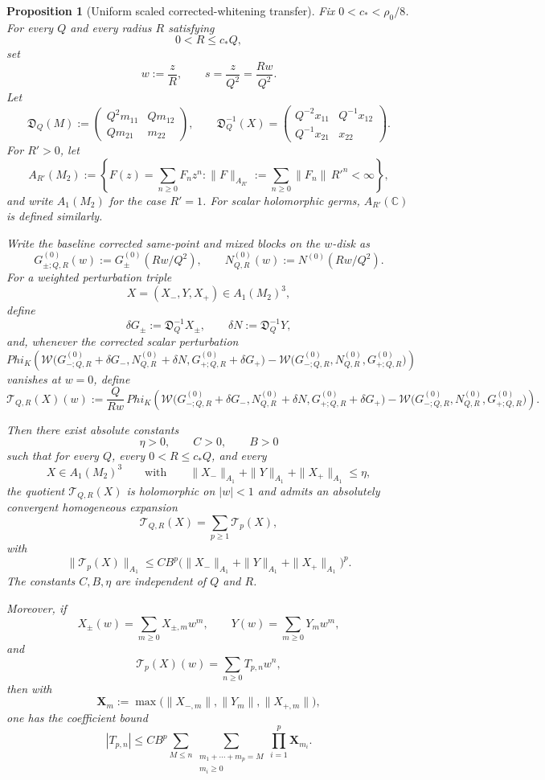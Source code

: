 \documentclass[11pt,a4paper]{amsart}
\def\Phi{Phi}%
\theoremstyle{plain}
\newtheorem{proposition}[theorem]{Proposition}
\theoremstyle{definition}
\begin{document}
\begin{proposition}[Uniform scaled corrected-whitening transfer]
\label{prop:differentiated-whitening-transfer}
Fix $0<c_*<\rho_0/8$. For every $Q$ and every radius $R$ satisfying
\[
0<R\le c_*Q,
\]
set
\[
w:=\frac{z}{R},
\qquad
s=\frac{z}{Q^2}=\frac{Rw}{Q^2}.
\]
Let
\[
\mathfrak D_Q(M):=
\begin{pmatrix}
Q^2 m_{11} & Q m_{12}\\
Q m_{21} & m_{22}
\end{pmatrix},
\qquad
\mathfrak D_Q^{-1}(X)=
\begin{pmatrix}
Q^{-2}x_{11} & Q^{-1}x_{12}\\
Q^{-1}x_{21} & x_{22}
\end{pmatrix}.
\]
For $R'>0$, let
\[
A_{R'}(M_2):=
\left\{
F(z)=\sum_{n\ge 0}F_n z^n:
\|F\|_{A_{R'}}:=\sum_{n\ge 0}\|F_n\|\,R'^n<\infty
\right\},
\]
and write $A_1(M_2)$ for the case $R'=1$. For scalar holomorphic germs,
$A_{R'}(\mathbb C)$ is defined similarly.

Write the baseline corrected same-point and mixed blocks on the $w$-disk as
\[
G^{(0)}_{\pm;Q,R}(w):=G_\pm^{(0)}(Rw/Q^2),
\qquad
N^{(0)}_{Q,R}(w):=N^{(0)}(Rw/Q^2).
\]
For a weighted perturbation triple
\[
X=(X_-,Y,X_+)\in A_1(M_2)^3,
\]
define
\[
\delta G_\pm:=\mathfrak D_Q^{-1}X_\pm,
\qquad
\delta N:=\mathfrak D_Q^{-1}Y,
\]
and, whenever the corrected scalar perturbation
\[
\Phi_K\!\left(
\mathcal W\bigl(
G^{(0)}_{-;Q,R}+\delta G_-,
N^{(0)}_{Q,R}+\delta N,
G^{(0)}_{+;Q,R}+\delta G_+
\bigr)
-
\mathcal W\bigl(
G^{(0)}_{-;Q,R},
N^{(0)}_{Q,R},
G^{(0)}_{+;Q,R}
\bigr)
\right)
\]
vanishes at $w=0$, define
\[
\mathcal T_{Q,R}(X)(w)
:=
\frac{Q}{Rw}\,
\Phi_K\!\left(
\mathcal W\bigl(
G^{(0)}_{-;Q,R}+\delta G_-,
N^{(0)}_{Q,R}+\delta N,
G^{(0)}_{+;Q,R}+\delta G_+
\bigr)
-
\mathcal W\bigl(
G^{(0)}_{-;Q,R},
N^{(0)}_{Q,R},
G^{(0)}_{+;Q,R}
\bigr)
\right).
\]

Then there exist absolute constants
\[
\eta>0,\qquad C>0,\qquad B>0
\]
such that for every $Q$, every $0<R\le c_*Q$, and every
\[
X\in A_1(M_2)^3
\qquad\text{with}\qquad
\|X_-\|_{A_1}+\|Y\|_{A_1}+\|X_+\|_{A_1}\le \eta,
\]
the quotient $\mathcal T_{Q,R}(X)$ is holomorphic on $|w|<1$ and admits an
absolutely convergent homogeneous expansion
\[
\mathcal T_{Q,R}(X)=\sum_{p\ge 1}\mathcal T_p(X),
\]
with
\[
\|\mathcal T_p(X)\|_{A_1}
\le
C B^p
\bigl(\|X_-\|_{A_1}+\|Y\|_{A_1}+\|X_+\|_{A_1}\bigr)^p.
\]
The constants $C,B,\eta$ are independent of $Q$ and $R$.

Moreover, if
\[
X_\pm(w)=\sum_{m\ge 0}X_{\pm,m}w^m,
\qquad
Y(w)=\sum_{m\ge 0}Y_m w^m,
\]
and
\[
\mathcal T_p(X)(w)=\sum_{n\ge 0} T_{p,n}w^n,
\]
then with
\[
\mathbf X_m:=\max\!\bigl(\|X_{-,m}\|,\|Y_m\|,\|X_{+,m}\|\bigr),
\]
one has the coefficient bound
\[
\boxed{
|T_{p,n}|
\le
C B^p
\sum_{M\le n}
\sum_{\substack{m_1+\cdots+m_p=M\\ m_i\ge 0}}
\prod_{i=1}^p \mathbf X_{m_i}.
}
\]
\end{proposition}
\end{document}
